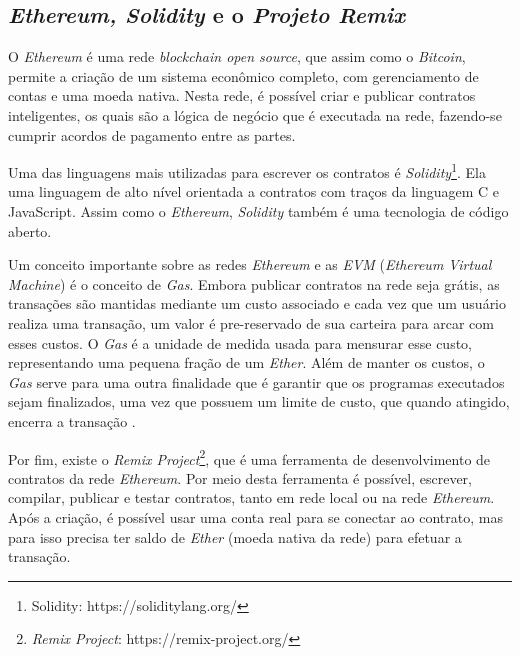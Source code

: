 \documentclass[portuguese]{textolivre}
\begin{document}
	\subsection{\textit{Ethereum, Solidity} e o \textit{Projeto Remix}}
	
	O \textit{Ethereum} é uma rede \textit{blockchain open source}, que assim como o \textit{Bitcoin}, permite a criação de um sistema econômico completo, com gerenciamento de contas e uma moeda nativa.  Nesta rede, é possível criar e publicar contratos inteligentes, os quais são a lógica de negócio que é executada na rede, fazendo-se cumprir acordos de pagamento entre as partes.%
	
	Uma das linguagens mais utilizadas para escrever os contratos é \textit{Solidity}\footnote{Solidity: https://soliditylang.org/}. Ela uma linguagem de alto nível orientada a contratos com traços da linguagem C e JavaScript. Assim como o \textit{Ethereum}, \textit{Solidity} também é uma tecnologia de código aberto.%
	
	Um conceito importante sobre as redes \textit{Ethereum} e as \textit{EVM} (\textit{Ethereum Virtual Machine}) é o conceito de \textit{Gas}. Embora publicar contratos na rede seja grátis, as transações são mantidas mediante um custo associado e cada vez que um usuário realiza uma transação, um valor é pre-reservado de sua carteira para arcar com esses custos. O \textit{Gas} é a unidade de medida usada para mensurar esse custo, representando uma pequena fração de um \textit{Ether}. Além de manter os custos,  o \textit{Gas} serve para uma outra finalidade que é garantir que os programas executados sejam finalizados, uma vez que possuem um limite de custo, que quando atingido, encerra a transação \cite{dannen2017introducing}. 
	
	Por fim, existe o \textit{Remix Project}\footnote{\emph{Remix Project}: https://remix-project.org/}, que é uma ferramenta de desenvolvimento de contratos da rede \textit{Ethereum}. Por meio desta ferramenta é possível, escrever, compilar, publicar e testar contratos, tanto em rede local ou na rede \textit{Ethereum}. Após a criação, é possível usar uma conta real para se conectar ao contrato, mas para isso precisa ter saldo de \textit{Ether} (moeda nativa da rede) para efetuar a transação. 
	
\end{document}
